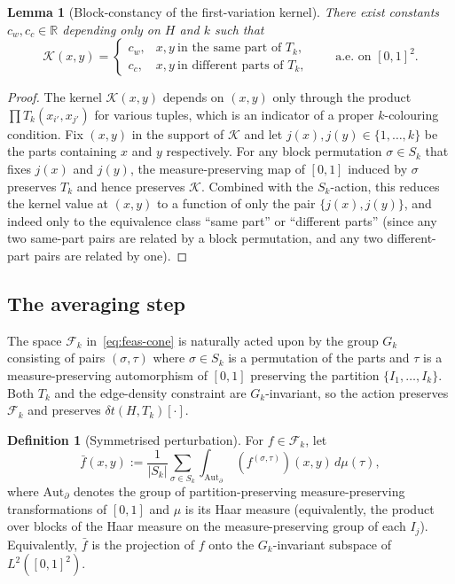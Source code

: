 \documentclass[11pt]{amsart}
\newtheorem{lemma}[theorem]{Lemma}
\theoremstyle{definition}
\newtheorem{definition}[theorem]{Definition}
\newcommand{\1}{\mathbf 1}
\newcommand{\R}{\mathbb R}
\newcommand{\dd}{\,d}
\begin{document}
\begin{lemma}[Block-constancy of the first-variation kernel]
\label{lem:K-block-constant}
There exist constants $c_w, c_c\in\R$ depending only on $H$ and $k$ such that
\[
   \mathcal K(x,y) =
   \begin{cases}
      c_w, & x,y\ \text{in the same part of }T_k,\\
      c_c, & x,y\ \text{in different parts of }T_k,
   \end{cases}
   \qquad\text{a.e.\ on }[0,1]^2.
\]
\end{lemma}

\begin{proof}
The kernel $\mathcal K(x,y)$ depends on $(x,y)$ only through the product
$\prod T_k(x_{i'}, x_{j'})$ for various tuples, which is an indicator of a
proper $k$-colouring condition.  Fix $(x,y)$ in the support of $\mathcal K$ and
let $j(x), j(y)\in\{1,\ldots,k\}$ be the parts containing $x$ and $y$
respectively.  For any block permutation $\sigma\in S_k$ that fixes $j(x)$ and
$j(y)$, the measure-preserving map of $[0,1]$ induced by $\sigma$ preserves
$T_k$ and hence preserves $\mathcal K$.  Combined with the $S_k$-action, this
reduces the kernel value at $(x,y)$ to a function of only the pair
$\{j(x), j(y)\}$, and indeed only to the equivalence class ``same part'' or
``different parts'' (since any two same-part pairs are related by a block
permutation, and any two different-part pairs are related by one).
\end{proof}

\subsection{The averaging step}

The space $\mathcal F_k$ in~\eqref{eq:feas-cone} is naturally acted upon by the
group $G_k$ consisting of pairs $(\sigma, \tau)$ where $\sigma\in S_k$ is a
permutation of the parts and $\tau$ is a measure-preserving automorphism of
$[0,1]$ preserving the partition $\{I_1,\ldots,I_k\}$.  Both $T_k$ and the
edge-density constraint are $G_k$-invariant, so the action preserves
$\mathcal F_k$ and preserves $\delta t(H,T_k)[\cdot]$.

\begin{definition}[Symmetrised perturbation]
For $f\in\mathcal F_k$, let
\[
   \bar f(x,y) := \frac{1}{|S_k|}\sum_{\sigma\in S_k}
   \int_{\mathrm{Aut}_\partial}\ (f^{(\sigma,\tau)})(x,y)\dd\mu(\tau),
\]
where $\mathrm{Aut}_\partial$ denotes the group of partition-preserving
measure-preserving transformations of $[0,1]$ and $\mu$ is its Haar measure
(equivalently, the product over blocks of the Haar measure on the
measure-preserving group of each $I_j$).  Equivalently, $\bar f$ is the
projection of $f$ onto the $G_k$-invariant subspace of $L^2([0,1]^2)$.
\end{definition}
\end{document}

